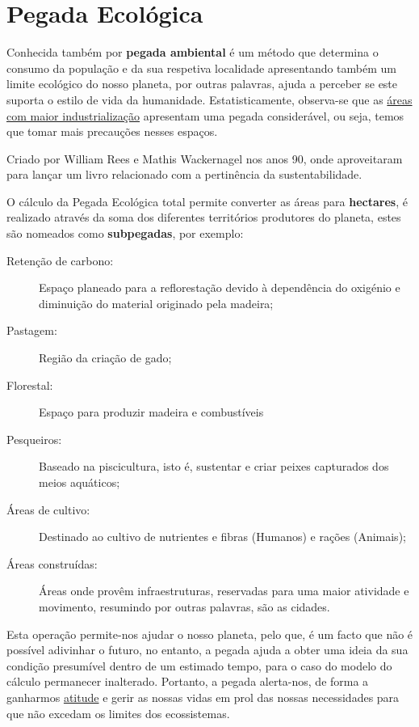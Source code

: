 \documentclass[letterpaper,12pt]{article}
\begin{document}
\section{Pegada Ecológica}
\vspace{0.5cm}
\par \citep{ecycle_o, sardinhadossantos_pegada}Conhecida também por \textbf{pegada ambiental} é um método que determina o consumo da população e da sua respetiva localidade apresentando também um limite ecológico do nosso planeta, por outras palavras, ajuda a perceber se este suporta o estilo de vida da humanidade. Estatisticamente, observa-se que as \underline{áreas com maior industrialização} apresentam uma pegada considerável, ou seja, temos que tomar mais precauções nesses espaços.
\par Criado por William Rees e Mathis Wackernagel nos anos 90, onde aproveitaram para lançar um livro relacionado com a pertinência da sustentabilidade.
\par O cálculo da Pegada Ecológica total permite converter as áreas para {\bf hectares}, é realizado através da soma dos diferentes territórios produtores do planeta, estes são nomeados como {\bf subpegadas}, por exemplo:
\begin{description}
    \item[Retenção de carbono:] Espaço planeado para a reflorestação devido à dependência do oxigénio e diminuição do material originado pela madeira; 
    \item[Pastagem:] Região da criação de gado;
    \item[Florestal:] Espaço para produzir madeira e combustíveis
    \item[Pesqueiros:] Baseado na piscicultura, isto é, sustentar e criar peixes capturados dos meios aquáticos;
    \item[Áreas de cultivo:] Destinado ao cultivo de nutrientes e fibras (Humanos) e rações (Animais);
    \item[Áreas construídas:] Áreas onde provêm infraestruturas, reservadas para uma maior atividade e movimento, resumindo por outras palavras, são as cidades.
\end{description}
\newpage
\par Esta operação permite-nos ajudar o nosso planeta, pelo que, é um facto que não é possível adivinhar o futuro, no entanto, a pegada ajuda a obter uma ideia da sua condição presumível dentro de um estimado tempo, para o caso do modelo do cálculo permanecer inalterado. Portanto, a pegada alerta-nos, de forma a ganharmos \hypertarget{thesentence1}{\underline{atitude}} e gerir as nossas vidas em prol das nossas necessidades para que não excedam os limites dos ecossistemas.\\[0.3cm]
\end{document}
